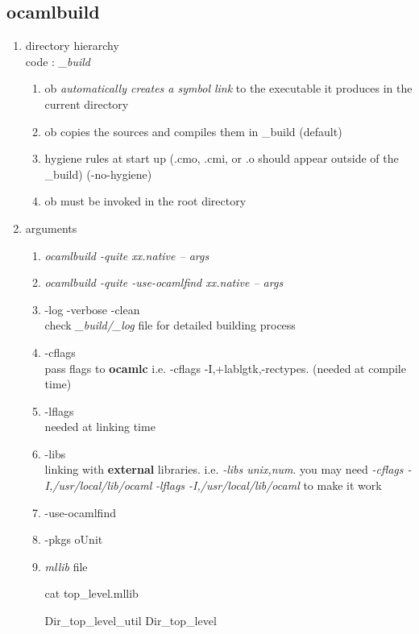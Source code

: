 
\subsection{ocamlbuild}
\begin{enumerate}
\item directory hierarchy \\
code : \textit{\_build}
\begin{enumerate}
\item ob \emph{automatically creates a symbol link} to the executable it
  produces in the current directory
\item ob copies the sources and compiles them in \_build (default)
\item hygiene rules at start up (.cmo, .cmi, or .o should appear
  outside of the \_build) (-no-hygiene)
\item ob must be invoked in the root directory
\end{enumerate}

\item arguments

\begin{enumerate}
\item \textit{ocamlbuild -quite xx.native -- args}
\item \textit{ocamlbuild -quite -use-ocamlfind xx.native -- args}
\item -log -verbose -clean \\
  check \textit{\_build/\_log} file for detailed building process 
\item -cflags \\
  pass flags to \textbf{ocamlc} i.e. 
  -cflags -I,+lablgtk,-rectypes. (needed at compile time)
\item -lflags \\
  needed at linking time 
\item -libs \\
   linking with \textbf{ external} libraries. i.e. \emph{-libs unix,num}.
   you may need   \emph{-cflags -I,/usr/local/lib/ocaml}  \emph{-lflags -I,/usr/local/lib/ocaml} to make it work 
\item -use-ocamlfind
\item -pkgs oUnit

\item \textit{mllib} file

  \begin{redcode}
cat top_level.mllib    
\end{redcode}
\begin{bluecode}
Dir_top_level_util
Dir_top_level  
\end{bluecode}


\end{enumerate}
\end{enumerate}
